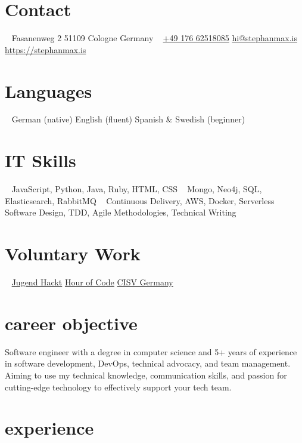\documentclass[a4paper]{cv}
\begin{document}

  \begin{aside}
    \section{Contact}
      ~
      Fasanenweg 2
      51109 Cologne
      Germany
      ~
      \href{tel:+4917662518085}{+49 176 62518085}
      \href{mailto:hi@stephanmax.is}{hi@stephanmax.is}
      \href{https://stephanmax.is}{https://stephanmax.is}
    \section{Languages}
      ~
      German (native)
      English (fluent)
      Spanish \& Swedish (beginner)
    \section{IT Skills}
      ~
      JavaScript, Python, Java, Ruby, HTML, CSS
      ~
      Mongo, Neo4j, SQL, Elasticsearch, RabbitMQ
      ~
      Continuous Delivery, AWS, Docker, Serverless
      ~
      Software Design, TDD, Agile Methodologies, Technical Writing
    \section{Voluntary Work}
      ~
      \href{https://jugendhackt.org/}{Jugend Hackt}
      \href{https://hourofcode.com/de}{Hour of Code}
      \href{http://de.cisv.org/}{CISV Germany}
  \end{aside}

  \section{career objective}

  Software engineer with a degree in computer science and 5+ years of experience in software development, DevOps, technical advocacy, and team management. Aiming to use my technical knowledge, communication skills, and passion for cutting-edge technology to effectively support your tech team.

  \section{experience}
\end{document}

